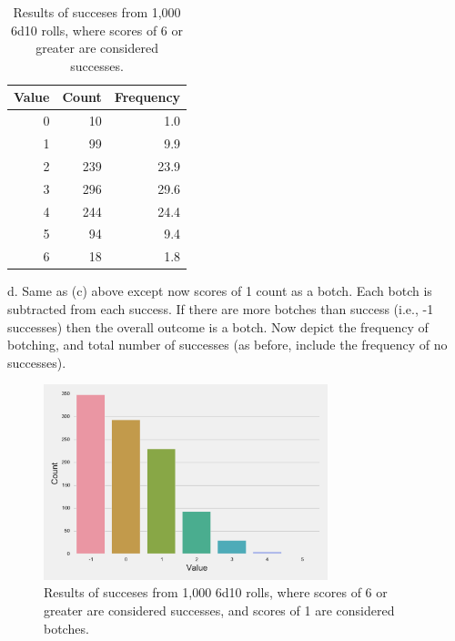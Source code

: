\documentclass[twocolumn,letterpaper]{article}  %
\begin{document}
\begin{table}%
\begin{center}
\begin{tabular}{*{3}{r}}
\toprule
Value & Count & Frequency \\
\midrule
0   &  10      &  1.0 \\
1   &  99      &  9.9 \\
2   & 239      & 23.9 \\
3   & 296      & 29.6 \\
4   & 244      & 24.4 \\
5   &  94      &  9.4 \\
6   &  18      &  1.8 \\
\bottomrule
\end{tabular}
\end{center}
\caption{Results of succeses from 1,000 6d10 rolls, where scores of 6 or greater are considered successes.}
\end{table}

d. Same as (c) above except now scores of 1 count as a botch. Each botch is subtracted from each success. If there are more botches than success (i.e., -1 successes) then the overall outcome is a botch. Now depict the frequency of botching, and total number of successes (as before, include the frequency of no successes).
\begin{figure}%
\centering
\includegraphics[width=3.25in]{6d10>6-botching.pdf}
\caption{Results of succeses from 1,000 6d10 rolls, where scores of 6 or greater are considered successes, and scores of 1 are considered botches.}
\end{figure}
\end{document}
